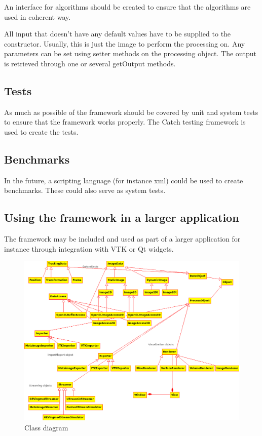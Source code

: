 \documentclass{article}
\begin{document}
An interface for algorithms should be created to ensure that the algorithms are used in coherent way.

All input that doesn't have any default values have to be supplied to the constructor.
Usually, this is just the image to perform the processing on.
Any parameters can be set using setter methods on the processing object.
The output is retrieved through one or several getOutput methods.


\subsection{Tests}

As much as possible of the framework should be covered by unit and system tests to ensure that the framework works properly.
The Catch testing framework is used to create the tests.

\subsection{Benchmarks}

In the future, a scripting language (for instance xml) could be used to create benchmarks.
These could also serve as system tests.

\subsection{Using the framework in a larger application}

The framework may be included and used as part of a larger application for instance through integration with VTK or Qt widgets.

\begin{figure}
    \includegraphics[width=\textwidth]{class_diagram.png}
    \caption{Class diagram}
\end{figure}
\end{document}
